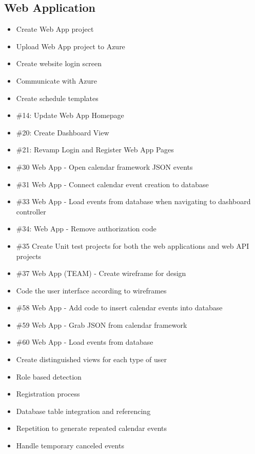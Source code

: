 \subsection*{Web Application}
\begin{itemize}
\item Create Web App project
\item Upload Web App project to Azure
\item Create website login screen
\item Communicate with Azure
\item Create schedule templates
\item \#14: Update Web App Homepage 
\item \#20: Create Dashboard View
\item \#21: Revamp Login and Register Web App Pages 
\item \#30 Web App - Open calendar framework JSON events
\item \#31 Web App - Connect calendar event creation to database
\item \#33 Web App - Load events from database when navigating to dashboard controller
\item \#34: Web App - Remove authorization code
\item \#35 Create Unit test projects for both the web applications and web API projects
\item \#37 Web App (TEAM) - Create wireframe for design
\item Code the user interface according to wireframes
\item \#58 Web App - Add code to insert calendar events into database
\item \#59 Web App - Grab JSON from calendar framework
\item \#60 Web App - Load events from database
\item Create distinguished views for each type of user
\item Role based detection
\item Registration process
\item Database table integration and referencing
\item Repetition to generate repeated calendar events
\item Handle temporary canceled events
\end{itemize}


